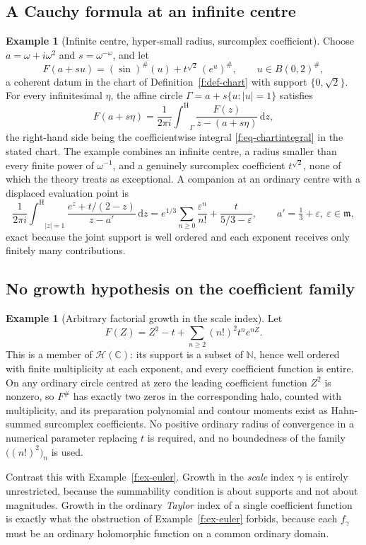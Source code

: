 \documentclass[11pt,a4paper]{article}
\numberwithin{equation}{section}
\theoremstyle{definition}
\newtheorem{example}[theorem]{Example}
\theoremstyle{remark}
\theoremstyle{plain}
\newcommand{\CC}{\mathbb C}
\newcommand{\NN}{\mathbb N}
\newcommand{\mm}{\mathfrak m}
\newcommand{\halo}[1]{#1^{\#}}
\newcommand{\ev}[1]{#1^{\#}}
\newcommand{\Hc}{\mathcal H}
\newcommand{\intH}{{\int^{\mathrm H}}}
\newcommand{\abs}[1]{\lvert #1\rvert}
\newcommand{\dd}{\mathrm d}
\begin{document}
\subsection{A Cauchy formula at an infinite centre}
\label{f:sub-infinitecentre}

\begin{example}[Infinite centre, hyper-small radius, surcomplex
coefficient]\label{f:ex-infcentre}
Choose $a=\omega+i\omega^{2}$ and $s=\omega^{-\omega}$, and let
\[
 F(a+su)=\ev{(\sin)}(u)+t^{\sqrt2}\,\ev{(e^{u})},
 \qquad u\in\halo{B(0,2)},
\]
a coherent datum in the chart of Definition~\ref{f:def-chart} with
support $\{0,\sqrt2\}$.  For every infinitesimal $\eta$, the affine
circle $\Gamma=a+s\{u:\abs u=1\}$ satisfies
\[
 F(a+s\eta)=\frac1{2\pi i}\intH_{\Gamma}
   \frac{F(z)}{z-(a+s\eta)}\,\dd z,
\]
the right-hand side being the coefficientwise integral
\eqref{f:eq-chartintegral} in the stated chart.  The example combines an
infinite centre, a radius smaller than every finite power of
$\omega^{-1}$, and a genuinely surcomplex coefficient $t^{\sqrt2}$,
none of which the theory treats as exceptional.  A companion at an
ordinary centre with a displaced evaluation point is
\[
 \frac1{2\pi i}\intH_{\abs z=1}
 \frac{e^{z}+t/(2-z)}{z-a'}\,\dd z
 =e^{1/3}\sum_{n\ge0}\frac{\varepsilon^{n}}{n!}
  +\frac{t}{5/3-\varepsilon},
 \qquad a'=\tfrac13+\varepsilon,\ \varepsilon\in\mm,
\]
exact because the joint support is well ordered and each exponent
receives only finitely many contributions.
\end{example}

\subsection{No growth hypothesis on the coefficient family}
\label{f:sub-nogrowth}

\begin{example}[Arbitrary factorial growth in the scale
index]\label{f:ex-nogrowth}
Let
\[
 F(Z)=Z^{2}-t+\sum_{n\ge2}(n!)^{2}t^{n}e^{nZ}.
\]
This is a member of $\Hc(\CC)$: its support is a subset of $\NN$, hence
well ordered with finite multiplicity at each exponent, and every
coefficient function is entire.  On any ordinary circle centred at zero
the leading coefficient function $Z^{2}$ is nonzero, so $\ev F$ has
exactly two zeros in the corresponding halo, counted with multiplicity,
and its preparation polynomial and contour moments exist as Hahn-summed
surcomplex coefficients.  No positive ordinary radius of convergence in
a numerical parameter replacing $t$ is required, and no boundedness of
the family $\bigl((n!)^{2}\bigr)_{n}$ is used.

Contrast this with Example~\ref{f:ex-euler}.  Growth in the \emph{scale}
index $\gamma$ is entirely unrestricted, because the summability
condition is about supports and not about magnitudes.  Growth in the
ordinary \emph{Taylor} index of a single coefficient function is exactly
what the obstruction of Example~\ref{f:ex-euler} forbids, because each
$f_{\gamma}$ must be an ordinary holomorphic function on a common
ordinary domain.
\end{example}
\end{document}
